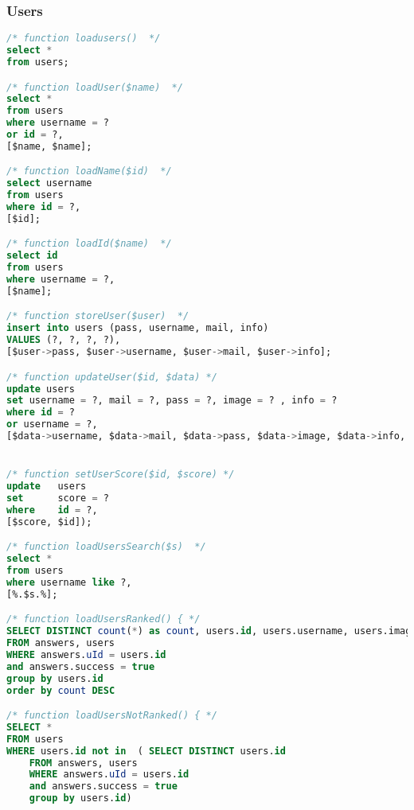 \subsubsection{Users}
\begin{lstlisting}[language=sql]
/* function loadusers()  */
select *
from users;

/* function loadUser($name)  */
select *
from users
where username = ?
or id = ?,
[$name, $name];

/* function loadName($id)  */
select username
from users
where id = ?,
[$id];

/* function loadId($name)  */
select id
from users
where username = ?,
[$name];

/* function storeUser($user)  */
insert into users (pass, username, mail, info)
VALUES (?, ?, ?, ?),
[$user->pass, $user->username, $user->mail, $user->info];

/* function updateUser($id, $data) */
update users
set username = ?, mail = ?, pass = ?, image = ? , info = ?
where id = ?
or username = ?,
[$data->username, $data->mail, $data->pass, $data->image, $data->info, $id, $id];


/* function setUserScore($id, $score) */
update   users
set      score = ?
where    id = ?,
[$score, $id]);

/* function loadUsersSearch($s)  */
select *
from users
where username like ?,
[%.$s.%];

/* function loadUsersRanked() { */
SELECT DISTINCT count(*) as count, users.id, users.username, users.image
FROM answers, users
WHERE answers.uId = users.id
and answers.success = true
group by users.id
order by count DESC

/* function loadUsersNotRanked() { */
SELECT *
FROM users
WHERE users.id not in  ( SELECT DISTINCT users.id
    FROM answers, users
    WHERE answers.uId = users.id
    and answers.success = true
    group by users.id)
\end{lstlisting}
